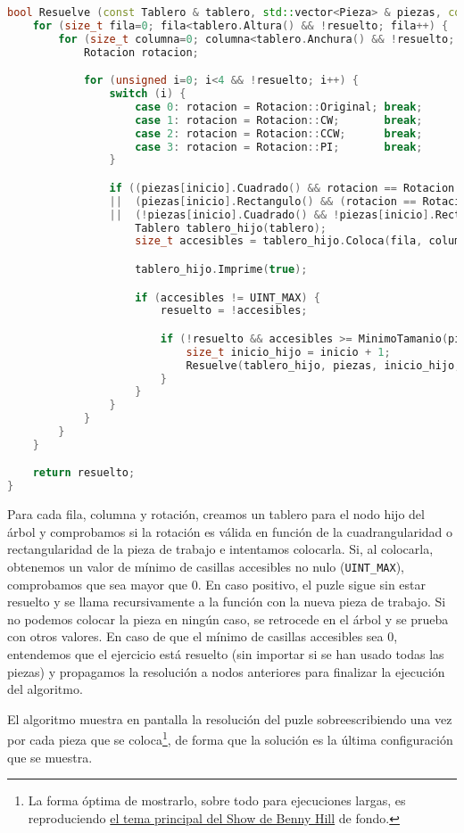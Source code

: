 \begin{lstlisting}[language=C++]
bool Resuelve (const Tablero & tablero, std::vector<Pieza> & piezas, const size_t & inicio, bool & resuelto) {
	for (size_t fila=0; fila<tablero.Altura() && !resuelto; fila++) {
		for (size_t columna=0; columna<tablero.Anchura() && !resuelto; columna++) {
			Rotacion rotacion;

			for (unsigned i=0; i<4 && !resuelto; i++) {
				switch (i) {
					case 0: rotacion = Rotacion::Original; break;
					case 1: rotacion = Rotacion::CW;       break;
					case 2: rotacion = Rotacion::CCW;      break;
					case 3: rotacion = Rotacion::PI;       break;
				}

				if ((piezas[inicio].Cuadrado() && rotacion == Rotacion::Original)
				||  (piezas[inicio].Rectangulo() && (rotacion == Rotacion::Original || rotacion == Rotacion::CW))
				||  (!piezas[inicio].Cuadrado() && !piezas[inicio].Rectangulo())) {
					Tablero tablero_hijo(tablero);
					size_t accesibles = tablero_hijo.Coloca(fila, columna, piezas[inicio], rotacion);

					tablero_hijo.Imprime(true);

					if (accesibles != UINT_MAX) {
						resuelto = !accesibles;

						if (!resuelto && accesibles >= MinimoTamanio(piezas, inicio+1)) {
							size_t inicio_hijo = inicio + 1;
							Resuelve(tablero_hijo, piezas, inicio_hijo, resuelto);
						}
					}
				}
			}
		}
	}

	return resuelto;
}
\end{lstlisting}

Para cada fila, columna y rotación, creamos un tablero para el nodo hijo del árbol y comprobamos si la rotación es válida en función de la cuadrangularidad o rectangularidad de la pieza de trabajo e intentamos colocarla.
Si, al colocarla, obtenemos un valor de mínimo de casillas accesibles no nulo (\texttt{UINT\_MAX}), comprobamos que sea mayor que $0$.
En caso positivo, el puzle sigue sin estar resuelto y se llama recursivamente a la función con la nueva pieza de trabajo.
Si no podemos colocar la pieza en ningún caso, se retrocede en el árbol y se prueba con otros valores.
En caso de que el mínimo de casillas accesibles sea $0$, entendemos que el ejercicio está resuelto (sin importar si se han usado todas las piezas) y propagamos la resolución a nodos anteriores para finalizar la ejecución del algoritmo.

El algoritmo muestra en pantalla la resolución del puzle sobreescribiendo una vez por cada pieza que se coloca\footnote{%
	La forma óptima de mostrarlo, sobre todo para ejecuciones largas, es reproduciendo \href{https://www.youtube.com/watch?v=MK6TXMsvgQg}{el tema principal del Show de Benny Hill} de fondo.
},
de forma que la solución es la última configuración que se muestra.

